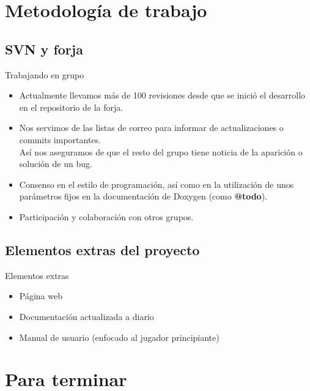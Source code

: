 \documentclass[9pt,xcolor=svgnames]{beamer}
\begin{document}
  
 \section{Metodología de trabajo}
 
  \subsection{SVN y forja}

  \begin{frame}{Trabajando en grupo}
   
   \begin{itemize}
    \item Actualmente llevamos más de 100 revisiones desde que se inició
	  el desarrollo en el repositorio de la forja.\\
	  \vspace*{0.3cm}

    \item Nos servimos de las listas de correo para informar de
	  actualizaciones o commits importantes.\\
	  Así nos aseguramos de que el resto del grupo tiene noticia de
	  la aparición o solución de un bug.\\
	  \vspace*{0.3cm}
	  
    \item Consenso en el estilo de programación, así como en la
	  utilización de unos parámetros fijos en la documentación de
	  Doxygen (como \textbf{@todo}).\\
	  \vspace*{0.3cm}

    \item Participación y colaboración con otros grupos.
   \end{itemize}
  \end{frame}
  
  
  \subsection{Elementos extras del proyecto}
  
  \begin{frame}{Elementos extras}
   \begin{itemize}
    \item Página web
    \item Documentación actualizada a diario
    \item Manual de usuario (enfocado al jugador principiante)
   \end{itemize}
  \end{frame}

 \section{Para terminar}
  

  
\end{document}
